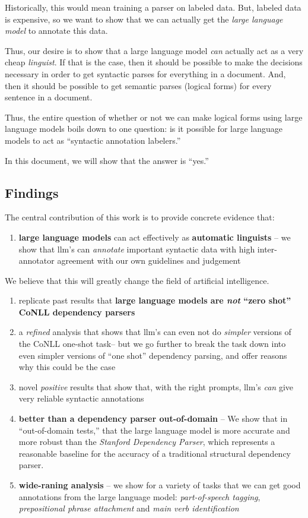 Historically, this would mean training a parser on labeled data.
But, labeled data is expensive, so we want to show that we can actually get the {\em large language model} to annotate this data.

Thus, our desire is to show that a large language model {\em can} actually act as a very cheap {\em linguist}.
If that is the case, then it should be possible to make the decisions necessary in order to get syntactic parses for everything in a document.
And, then it should be possible to get semantic parses (logical forms) for every sentence in a document.

Thus, the entire question of whether or not we can make logical forms using large language models boils down to one question: is it possible for large language models to act as ``syntactic annotation labelers.''

In this document, we will show that the answer is ``yes.''

\subsection{Findings}
The central contribution of this work is to provide concrete evidence that:
\begin{enumerate}
    \item {\bf large language models} can act effectively as {\bf automatic linguists} -- we show that llm's can {\em annotate} important syntactic data with high inter-annotator agreement with our own guidelines and judgement
\end{enumerate}
We believe that this will greatly change the field of artificial intelligence.



\begin{enumerate}
    \item replicate past results that {\bf large language models are {\em not} ``zero shot'' CoNLL dependency parsers}
    \item a {\em refined} analysis that shows that llm's can even not do {\em simpler} versions of the CoNLL one-shot task-- but we go further to break the task down into even simpler versions of ``one shot'' dependency parsing, and offer reasons why this could be the case
    \item novel {\em positive} results that show that, with the right prompts, llm's {\em can} give very reliable syntactic annotations
    \item {\bf better than a dependency parser out-of-domain} -- We show that in ``out-of-domain tests,'' that the large language model is more accurate and more robust than the {\em Stanford Dependency Parser}, which represents a reasonable baseline for the accuracy of a traditional structural dependency parser.
    \item {\bf wide-raning analysis} -- we show for a variety of tasks that we can get good annotations from the large language model: {\em part-of-speech tagging}, {\em prepositional phrase attachment} and {\em main verb identification}
\end{enumerate}